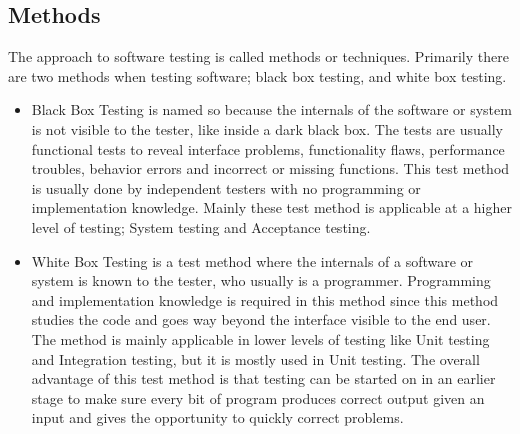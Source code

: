 \subsection{Methods}
The approach to software testing is called methods or techniques. Primarily there are two methods when testing software; black box testing, and white box testing.
\begin{itemize}
\item \label{def:blackboxtesting} Black Box Testing is named so because the internals of the software or system is not visible to the tester, like inside a dark black box. The tests are usually functional tests to reveal interface problems, functionality flaws, performance troubles, behavior errors and incorrect or missing functions. This test method is usually done by independent testers with no programming or implementation knowledge. Mainly these test method is applicable at a higher level of testing; System testing and Acceptance testing.
\item White Box Testing is a test method where the internals of a software or system is known to the tester, who usually is a programmer. Programming and implementation knowledge is required in this method since this method studies the code and goes way beyond the interface visible to the end user. The method is mainly applicable in lower levels of testing like Unit testing and Integration testing, but it is mostly used in Unit testing. The overall advantage of this test method is that testing can be started on in an earlier stage to make sure every bit of program produces correct output given an input and gives the opportunity to quickly correct problems.
\end{itemize}
